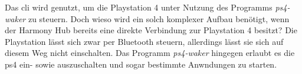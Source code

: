 Das \ac{cli} wird genutzt, um die Playstation 4 unter Nutzung des Programms \textit{ps4-waker}\cite{dhleongp12:online} zu steuern.
Doch wieso wird ein solch komplexer Aufbau benötigt, wenn der Harmony Hub bereits eine direkte Verbindung zur Playstation 4 besitzt?
Die Playstation lässt sich zwar per Bluetooth steuern, allerdings lässt sie sich auf diesem Weg nicht einschalten.
Das Programm \textit{ps4-waker} hingegen erlaubt es die \ac{ps4} ein- sowie auszuschalten und sogar bestimmte Anwndungen zu starten.
